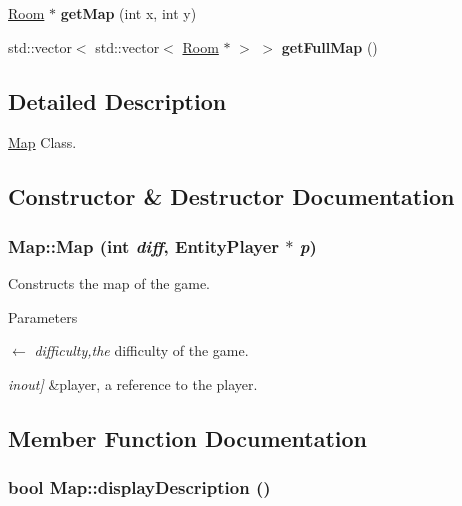 \begin{DoxyCompactItemize}
\item 
\hypertarget{classMap_a94b10e9d3bd31fef60c2178e9ecfcd11}{
\hyperlink{classRoom}{Room} $\ast$ {\bfseries getMap} (int x, int y)}
\label{classMap_a94b10e9d3bd31fef60c2178e9ecfcd11}

\item 
\hypertarget{classMap_a93e05e553b959995d296cabb76df67dd}{
std::vector$<$ std::vector$<$ \hyperlink{classRoom}{Room} $\ast$ $>$ $>$ {\bfseries getFullMap} ()}
\label{classMap_a93e05e553b959995d296cabb76df67dd}

\end{DoxyCompactItemize}


\subsection{Detailed Description}
\hyperlink{classMap}{Map} Class. 

\subsection{Constructor \& Destructor Documentation}
\hypertarget{classMap_aba466e7794843d6452e216e2c99fa69d}{
\subsubsection[{Map}]{\setlength{\rightskip}{0pt plus 5cm}Map::Map (int {\em diff}, \/  {\bf EntityPlayer} $\ast$ {\em p})}}
\label{classMap_aba466e7794843d6452e216e2c99fa69d}


Constructs the map of the game. 
\begin{DoxyParams}{Parameters}
\item[\mbox{$\leftarrow$} {\em difficulty,the}]difficulty of the game. \item[{\em inout\mbox{]}}]\&player, a reference to the player. \end{DoxyParams}


\subsection{Member Function Documentation}
\hypertarget{classMap_a973b435af324185a04990a4993a90e2d}{
\subsubsection[{displayDescription}]{\setlength{\rightskip}{0pt plus 5cm}bool Map::displayDescription ()}}
\label{classMap_a973b435af324185a04990a4993a90e2d}


